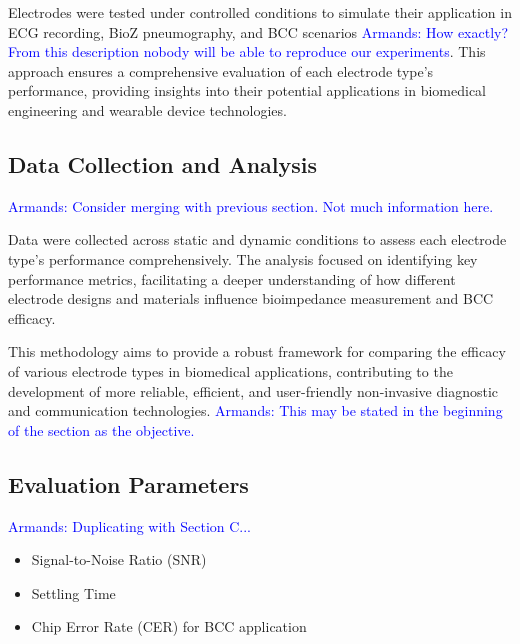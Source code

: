 \documentclass[conference]{IEEEtran}
\newcommand{\notea}[1]{\textcolor{blue}{Armands: #1}}
\begin{document}
Electrodes were tested under controlled conditions to simulate their application in ECG recording, BioZ pneumography, and BCC scenarios \notea{How exactly? From this description nobody will be able to reproduce our experiments}. This approach ensures a comprehensive evaluation of each electrode type's performance, providing insights into their potential applications in biomedical engineering and wearable device technologies.

\subsection{Data Collection and Analysis}
\notea{Consider merging with previous section. Not much information here.}

Data were collected across static and dynamic conditions to assess each electrode type's performance comprehensively. The analysis focused on identifying key performance metrics, facilitating a deeper understanding of how different electrode designs and materials influence bioimpedance measurement and BCC efficacy.

This methodology aims to provide a robust framework for comparing the efficacy of various electrode types in biomedical applications, contributing to the development of more reliable, efficient, and user-friendly non-invasive diagnostic and communication technologies. \notea{This may be stated in the beginning of the section as the objective.}


\subsection{Evaluation Parameters}
\notea{Duplicating with Section C...}
\begin{itemize}
    \item Signal-to-Noise Ratio (SNR)
    \item Settling Time
    \item Chip Error Rate (CER) for BCC application
    

\end{itemize}
\end{document}
